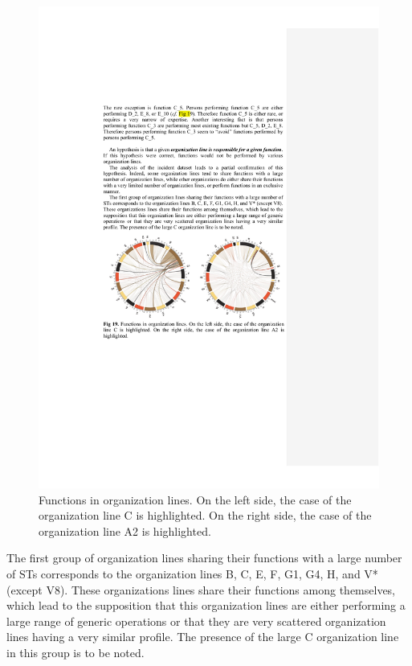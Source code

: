 \documentclass[lnbip]{svmultln}
\begin{document}
\begin{figure}
  \begin{center}
    \includegraphics[width=\textwidth]{"figs/pic 21"}
  \end{center}
  \caption{Functions in organization lines. On the left side, the case of the organization line C is highlighted. On the right side, the case of the organization line A2 is highlighted.}
  \label{fig:functionsByOrgs}
\end{figure}


The first group of organization lines sharing their functions with a large number of STs corresponds to the organization lines B, C, E, F, G1, G4, H, and V* (except V8). These organizations lines share their functions among themselves, which lead to the supposition that this organization lines are either performing a large range of generic operations or that they are very scattered organization lines having a very similar profile. The presence of the large C organization line in this group is to be noted.
\end{document}
